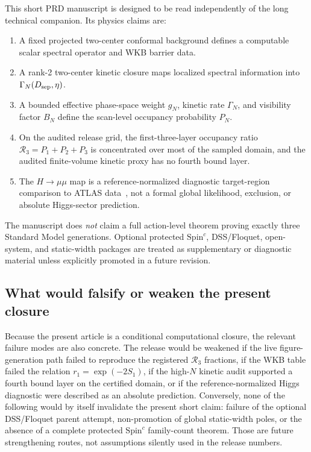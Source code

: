 \documentclass[aps,prd,onecolumn,notitlepage,nofootinbib,superscriptaddress,11pt,floatfix]{revtex4-2}
\newcommand{\Rthree}{\mathcal{R}_3}
\newcommand{\Dsep}{D_{\rm sep}}
\begin{document}
This short PRD manuscript is designed to be read independently of the long technical companion.
Its physics claims are:
\begin{enumerate}
    \item A fixed projected two-center conformal background defines a computable scalar spectral operator and WKB barrier data.
    \item A rank-2 two-center kinetic closure maps localized spectral information into \(\Gamma_N(\Dsep,\eta)\).
    \item A bounded effective phase-space weight \(g_N\), kinetic rate \(\Gamma_N\), and visibility factor \(B_N\) define the scan-level occupancy probability \(P_N\).
    \item On the audited release grid, the first-three-layer occupancy ratio \(\Rthree=P_1+P_2+P_3\) is concentrated over most of the sampled domain, and the audited finite-volume kinetic proxy has no fourth bound layer.
    \item The \(H\to\mu\mu\) map is a reference-normalized diagnostic target-region comparison to ATLAS data~\cite{ATLAS_Hmumu}, not a formal global likelihood, exclusion, or absolute Higgs-sector prediction.
\end{enumerate}

The manuscript does \emph{not} claim a full action-level theorem proving exactly three Standard Model generations.
Optional protected \(\mathrm{Spin}^c\), DSS/Floquet, open-system, and static-width packages are treated as supplementary or diagnostic material unless explicitly promoted in a future revision.

\subsection{What would falsify or weaken the present closure}

Because the present article is a conditional computational closure, the relevant failure modes are also concrete.
The release would be weakened if the live figure-generation path failed to reproduce the registered \(\Rthree\) fractions, if the WKB table failed the relation \(r_1=\exp(-2S_1)\), if the high-\(N\) kinetic audit supported a fourth bound layer on the certified domain, or if the reference-normalized Higgs diagnostic were described as an absolute prediction.
Conversely, none of the following would by itself invalidate the present short claim: failure of the optional DSS/Floquet parent attempt, non-promotion of global static-width poles, or the absence of a complete protected \(\mathrm{Spin}^c\) family-count theorem.
Those are future strengthening routes, not assumptions silently used in the release numbers.
\end{document}
